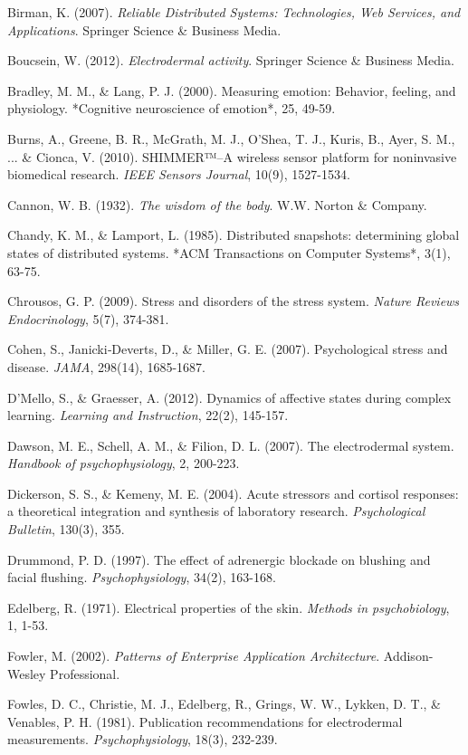 \documentclass[12pt,a4paper]{article}
\begin{document}
Birman, K. (2007). \textit{Reliable Distributed Systems: Technologies, Web Services, and Applications}. Springer Science \&
Business Media.

Boucsein, W. (2012). \textit{Electrodermal activity}. Springer Science \& Business Media.

Bradley, M. M., \& Lang, P. J. (2000). Measuring emotion: Behavior, feeling, and physiology. *Cognitive neuroscience of
emotion*, 25, 49-59.

Burns, A., Greene, B. R., McGrath, M. J., O'Shea, T. J., Kuris, B., Ayer, S. M., ... \& Cionca, V. (2010). SHIMMER™–A
wireless sensor platform for noninvasive biomedical research. \textit{IEEE Sensors Journal}, 10(9), 1527-1534.

Cannon, W. B. (1932). \textit{The wisdom of the body}. W.W. Norton \& Company.

Chandy, K. M., \& Lamport, L. (1985). Distributed snapshots: determining global states of distributed systems. *ACM
Transactions on Computer Systems*, 3(1), 63-75.

Chrousos, G. P. (2009). Stress and disorders of the stress system. \textit{Nature Reviews Endocrinology}, 5(7), 374-381.

Cohen, S., Janicki‐Deverts, D., \& Miller, G. E. (2007). Psychological stress and disease. \textit{JAMA}, 298(14), 1685-1687.

D'Mello, S., \& Graesser, A. (2012). Dynamics of affective states during complex learning. \textit{Learning and Instruction},
22(2), 145-157.

Dawson, M. E., Schell, A. M., \& Filion, D. L. (2007). The electrodermal system. \textit{Handbook of psychophysiology}, 2,
200-223.

Dickerson, S. S., \& Kemeny, M. E. (2004). Acute stressors and cortisol responses: a theoretical integration and
synthesis of laboratory research. \textit{Psychological Bulletin}, 130(3), 355.

Drummond, P. D. (1997). The effect of adrenergic blockade on blushing and facial flushing. \textit{Psychophysiology}, 34(2),
163-168.

Edelberg, R. (1971). Electrical properties of the skin. \textit{Methods in psychobiology}, 1, 1-53.

Fowler, M. (2002). \textit{Patterns of Enterprise Application Architecture}. Addison-Wesley Professional.

Fowles, D. C., Christie, M. J., Edelberg, R., Grings, W. W., Lykken, D. T., \& Venables, P. H. (1981). Publication
recommendations for electrodermal measurements. \textit{Psychophysiology}, 18(3), 232-239.
\end{document}
